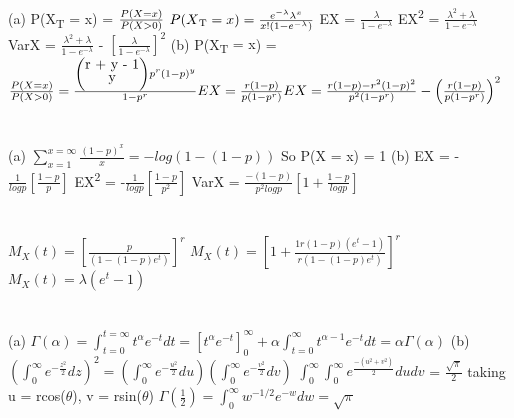 \documentclass{report}
\begin{document}
\section{}
(a) P(X{\textsubscript{T} = x}) = $\frac{P(X = x)}{P(X > 0)} \newline$
$P(X\textsubscript{T} = x) = \frac{e^{-\lambda}\lambda^x}{x!(1 - e^{-\lambda})}$
\newline
EX = $\frac{\lambda}{1 - e^{-\lambda}}$
EX{\textsuperscript{2}} = $\frac{\lambda^{2} + \lambda}{1 - e^{-\lambda}}$
\newline
VarX = $\frac{\lambda^{2} + \lambda}{1 - e^{-\lambda}}$ - $\left[\frac{\lambda}{1 - e^{-\lambda}}\right]^{2}$
\newline
(b) P(X{\textsubscript{T} = x}) = $\frac{P(X = x)}{P(X > 0)} \newline
 = \frac{\left(\stackanchor{r + y - 1}{y}\right)p^r(1 - p)^y}{1 - p^r} \newline
EX = \frac{r(1 - p)}{p(1 - p^r)}
EX = \frac{r(1 - p) - r^2(1 - p)^2}{p^2(1 - p^r)} - \left(\frac{r(1 - p)}{p(1 - p^r)}\right)^2
$
\section{}
(a) $\sum_{x=1}^{x=\infty}\frac{(1-p)^{x}}{x} =  - log(1 - (1 - p))$
So P(X = x) = 1
\newline
(b) EX = -$\frac{1}{log p} \left[\frac{1 - p}{p}\right]$
\newline
EX{\textsuperscript{2}} = -$\frac{1}{log p} \left[\frac{1 - p}{p^2}\right]$
\newline
VarX = $\frac{-(1 - p)}{p^2log p}\left[1 + \frac{1 - p}{log p}\right]$
\newline

\section{}
$M_{X}(t) = \left[\frac{p}{(1 - (1 - p)e^t)}\right]^r$
\newline
$M_{X}(t) = \left[1 + \frac{1 r(1-p)(e^t - 1)}{r (1 - (1 - p)e^t)}\right]^r$
\newline
$M_{X}(t) = \lambda(e^t - 1)$
\newline

\section{}
(a) $\Gamma(\alpha) = \int_{t=0}^{t=\infty}t^{\alpha}e^{-t}dt  = \left[t^{\alpha}e^{-t}\right]^{\infty}_{0} + \alpha\int_{t=0}^{\infty}t^{\alpha - 1}e^{-t}dt = \alpha\Gamma(\alpha)$
\newline
(b) $\left(\int_{0}^{\infty}e^{-\frac{z^2}{2}}dz\right)^2 = \left(\int_{0}^{\infty}e^{-\frac{u^2}{2}}du\right)\left(\int_{0}^{\infty}e^{-\frac{v^2}{2}}dv\right)$
\newline
$\int_{0}^{\infty} \int_{0}^{\infty}e^{\frac{-(u^2 + v^2)}{2}}dudv$ = $\frac{\sqrt{\pi}}{2}$
taking u = rcos($\theta$), v = rsin($\theta$)
\newline
$\Gamma(\frac{1}{2}) = \int_{0}^{\infty}w^{-1/2}e^{-w}dw = \sqrt{\pi}$
\newline
\end{document}
